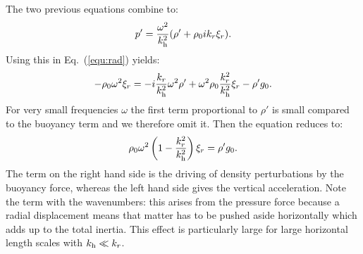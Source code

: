 \documentclass[12pt]{article}
\begin{document}
The two previous equations combine to:
\begin{equation}
p' = \frac{\omega^2}{k_{\rm h}^2} (\rho' + \rho_0 i k_r \xi_r).\label{equ:pprime}
\end{equation}
Using this in Eq.~(\ref{equ:rad}) yields:
\begin{equation}
-\rho_0 \omega^2 \xi_r = -i \frac{k_r}{k_{\rm h}^2}\omega^2 \rho' + \omega^2 \rho_0 \frac{k_r^2}{k_{\rm h}^2}\xi_r -\rho' g_0.
\end{equation}
For very small frequencies $\omega$ the first term proportional to
$\rho'$ is small compared to the buoyancy term and we therefore omit
it. Then the equation reduces to:
\begin{equation}
\rho_0 \omega^2 \left(1 - \frac{k_r^2}{k_{\rm h}^2} \right)\xi_r = \rho' g_0.\label{equ:rhoom}
\end{equation}
The term on the right hand side is the driving of density
perturbations by the buoyancy force, whereas the left hand side gives
the vertical acceleration. Note the term with the wavenumbers: this
arises from the pressure force because a radial displacement means
that matter has to be pushed aside horizontally which adds up to the
total inertia. This effect is particularly large for large horizontal
length scales with $k_{\rm h} \ll k_r$.
\end{document}
